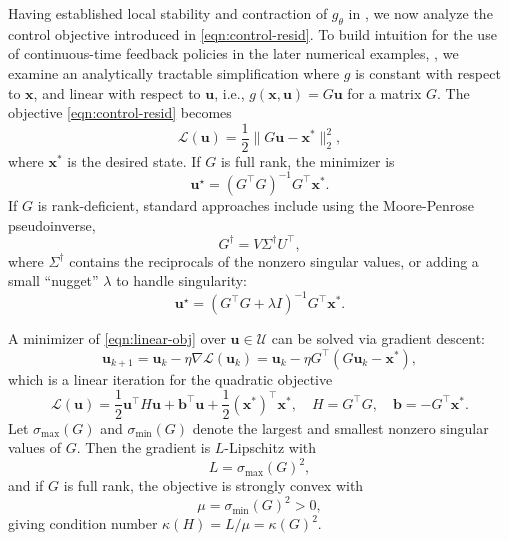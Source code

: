 \documentclass[11pt,twoside]{article}
\theoremstyle{plain}
\theoremstyle{definition}
\theoremstyle{remark}
\newcommand{\vect}[1]{\boldsymbol{#1}}
\begin{document}
\label{sec:solving-control}
Having established local stability and contraction of \(g_\theta\) 
in , we now analyze the control objective 
introduced in \cref{eqn:control-resid}. To build intuition for the use of continuous-time feedback policies in the later numerical examples, , we examine an analytically tractable simplification where \(g\) is constant with respect to \(\vect{x}\), and linear with respect to \(\vect{u}\), i.e., \(g(\vect{x},\vect{u}) = G\vect{u}\) for a matrix \(G\). The objective \cref{eqn:control-resid} becomes
\begin{equation}
    \mathcal{L}(\vect{u}) = \frac{1}{2} \|G\vect{u} - \vect{x}^*\|_2^2,
    \label{eqn:linear-obj}
\end{equation}
where \(\vect{x}^*\) is the desired state. If \(G\) is full rank, the minimizer is
\begin{equation}
    \vect{u}^\star = (G^\intercal G)^{-1} G^\intercal\vect{x}^*.
\end{equation}
If \(G\) is rank-deficient, standard approaches include using the Moore-Penrose pseudoinverse,
\begin{equation}
    G^\dagger = V \Sigma^\dagger U^\intercal,
\end{equation}
where \(\Sigma^\dagger\) contains the reciprocals of the nonzero singular values, or adding a small ``nugget'' \(\lambda\) to handle singularity:
\begin{equation}
    \vect{u}^\star = (G^\intercal G + \lambda I)^{-1} G^\intercal \vect{x}^*.
\end{equation}


A minimizer of \eqref{eqn:linear-obj} over \(\vect{u} \in \mathcal{U}\) can be solved via gradient descent:
\begin{equation}
    \vect{u}_{k+1} = \vect{u}_k - \eta \nabla \mathcal{L}(\vect{u}_k) = \vect{u}_k - \eta G^\intercal (G \vect{u}_k - \vect{x}^*),
\end{equation}
which is a linear iteration for the quadratic objective
\begin{equation}
    \mathcal{L}(\vect{u}) = \frac{1}{2} \vect{u}^\intercal H \vect{u} + \vect{b}^\intercal \vect{u} + \frac{1}{2} (\vect{x}^*)^\intercal \vect{x}^*, \quad H = G^\intercal G, \quad \vect{b} = -G^\intercal \vect{x}^*.
\end{equation}
Let \(\sigma_{\max}(G)\) and \(\sigma_{\min}(G)\) denote the largest and smallest nonzero singular values of \(G\). Then the gradient is \(L\)-Lipschitz with
\begin{equation}
    L = \sigma_{\max}(G)^2,
\end{equation}
and if \(G\) is full rank, the objective is strongly convex with
\begin{equation}
    \mu = \sigma_{\min}(G)^2 > 0,
\end{equation}
giving condition number \(\kappa(H) = L / \mu = \kappa(G)^2\). 
\end{document}
